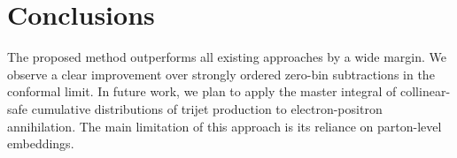 \section{Conclusions}\label{sec:conclusions}

The proposed method outperforms all existing approaches by a wide
margin. We observe a clear improvement over strongly ordered zero-bin
subtractions in the conformal limit. In future work, we plan to apply
the master integral of collinear-safe cumulative distributions of trijet
production to electron-positron annihilation. The main limitation of
this approach is its reliance on parton-level embeddings.

